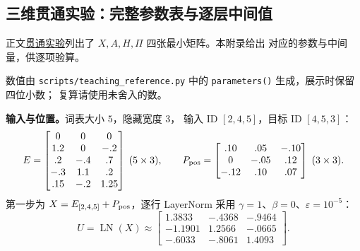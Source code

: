 \subsection{三维贯通实验：完整参数表与逐层中间值}
\label{app:transformer-intermediates}

正文\hyperref[intro:22b-token-to-output]{贯通实验}列出了
$X,A,H,\Pi$ 四张最小矩阵。本附录给出
对应的参数与中间量，供逐项验算。

数值由 \nolinkurl{scripts/teaching_reference.py} 中的
\texttt{parameters()} 生成，展示时保留四位小数；
复算请使用未舍入的数。

\textbf{输入与位置。}词表大小 $5$，隐藏宽度 $3$，
输入 ID $[2,4,5]$，目标 ID $[4,5,3]$：
\[
E=\begin{bmatrix}
0&0&0\\1.2&0&-.2\\.2&-.4&.7\\-.3&1.1&.2\\.15&-.2&1.25
\end{bmatrix}\;(5\times3),\qquad
P_{\rm pos}=\begin{bmatrix}
.10&.05&-.10\\0&-.05&.12\\-.12&.10&.07
\end{bmatrix}\;(3\times3).
\]
第一步为 $X=E_{[2,4,5]}+P_{\rm pos}$，逐行 LayerNorm
采用 $\gamma=1$、$\beta=0$、$\varepsilon=10^{-5}$：
\[
U=\operatorname{LN}(X)\approx
\begin{bmatrix}
1.3833&-.4368&-.9464\\
-1.1901&1.2566&-.0665\\
-.6033&-.8061&1.4093
\end{bmatrix}.
\]

